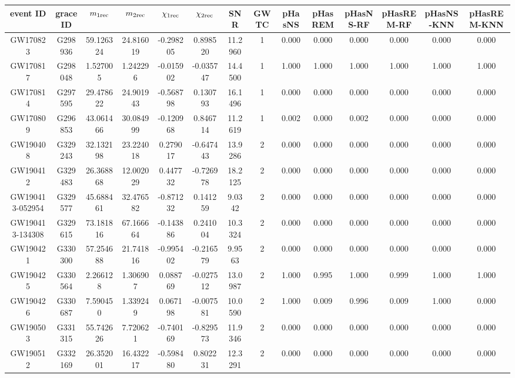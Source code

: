 \begin{table}[]
\centering
\begin{tabular}{cccccccccccccc}
\hline
event ID & grace ID & $m_{1 {\rm rec}}$ & $m_{2{\rm rec}}$ & $\chi_{1{\rm rec}}$ & $\chi_{2{\rm rec}}$ & SNR & GWTC & pHasNS & pHasREM & pHasNS-RF & pHasREM-RF & pHasNS-KNN & pHasREM-KNN \\
\hline 
\hline
GW170823 &	G298936 &	59.126324 &	24.816019 &	-0.298205 &	0.898520 &	11.2960 &	1 & 0.000 & 0.000 &	0.000 &	0.000 & 0.000 &	0.000 \\
GW170817 &	G298048 &	1.527005 &	1.242296 &	-0.015902 &	-0.035747 &	14.4500 & 1 & 1.000 & 1.000 &	1.000 &	1.000 & 1.000 & 1.000 \\
GW170814 &	G297595 &	29.478622 &	24.901943 &	-0.568798 &	0.130793 &	16.1496 &	1 & 0.000 & 0.000 &	0.000 &	0.000 & 0.000 & 0.000 \\
GW170809 &	G296853 &	43.061466 &	30.084999 &	-0.120968 &	0.846714 & 	11.2619 &	1 & 0.002 &	0.000 &	0.002 & 0.000 & 0.000 & 0.000 \\
GW190408 &	G329243 &	32.132198 &	23.224018 &	0.279017 &	-0.647443 &	13.9286 &	2 & 0.000 &	0.000 	&	0.000 &	0.000 & 0.000 & 0.000 \\
GW190412 &	G329483 &	26.368868 &	12.002029 &	0.447732 &	-0.726978 &	18.2125 &	2 & 0.000 &	0.000 &	0.000 &	0.000 & 0.000 & 0.000 \\
GW190413-052954 &	G329577 &	45.688461 &	32.476582 &	-0.871232 &	0.141259 & 	9.0342 &	2 & 0.000 &	0.000 	 &	0.000  & 0.000 & 0.000 & 0.000 \\
GW190413-134308 &	G329615 &	73.181816 &	67.166664 &	-0.143886 &	0.241004 &	10.3324 &	2 & 0.000 &	0.000  & 0.000 &	0.000 & 0.000 & 0.000 \\
GW190421 &	G330300 &	57.254688 &	21.741816 &	-0.995402 &	-0.216579 &	9.9563 &	2 & 0.000 &	0.000 	&	0.000 &	0.000 & 0.000 & 0.000 \\
GW190425 &	G330564 &	2.266128 &	1.306907 &	0.088769 & -0.027512 & 	13.0987 &	2 & 1.000 &	0.995 &	1.000 &	0.999 & 1.000 & 1.000 \\
GW190426 &	G330687 &	7.590450 &	1.339249 &	0.067198 &	-0.007581 &	10.0590 &	2 & 1.000 &	0.009 &	0.996 & 0.009 & 1.000 & 0.000 \\
GW190503 &	G331315 &	55.742626 &	7.720621 &	-0.740169 &	-0.829573 &	11.9346 &	2 & 0.000 &	0.000 &	0.000 &	0.000 & 0.000 & 0.000 \\
GW190512 &	G332169 &	26.352001 &	16.432217 &	-0.598480 &	0.802231 &	12.3291 &	2 & 0.000 	&0.000 & 0.000 &	0.000 & 0.000 & 0.000 \\

\end{tabular}
\end{table}
